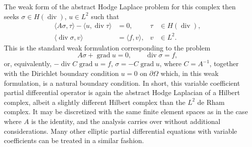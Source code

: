 {The weak form of the abstract Hodge Laplace problem for this complex then seeks $\sigma\in H(\operatorname{div})$, $u\in L^2$ such that}
\[
\begin{aligned}
\langle A\sigma,\tau\rangle-\langle u,\operatorname{div}\tau\rangle&=0,&\tau&\in H(\operatorname{div}),\\
\langle\operatorname{div}\sigma,v\rangle&=\langle f,v\rangle,&v&\in L^2.
\end{aligned}
\]
{This is the standard weak formulation corresponding to the problem}
\[
A\sigma+\operatorname{grad}u=0,\qquad\operatorname{div}\sigma=f,
\]
{or, equivalently, $-\operatorname{div}C\operatorname{grad}u=f$, $\sigma=-C\operatorname{grad}u$, where $C=A^{-1}$, together with the Dirichlet boundary condition $u=0$ on $\partial\Omega$ which, in this weak formulation, is a natural boundary condition. In short, this variable coefficient partial differential operator is again the abstract Hodge Laplacian of a Hilbert complex, albeit a slightly different Hilbert complex than the $L^2$ de Rham complex. It may be discretized with the same finite element spaces as in the case where $A$ is the identity, and the analysis carries over without additional considerations. Many other elliptic partial differential equations with variable coefficients can be treated in a similar fashion.}
